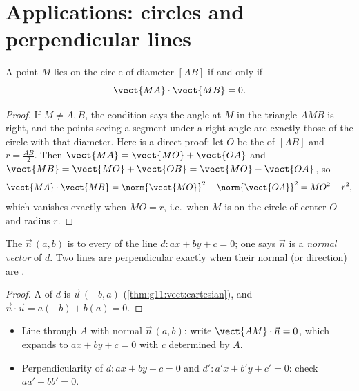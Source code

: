 \section{Applications: circles and perpendicular lines}

\begin{proposition}\label{prop:g11:scal:diameter}
A point $M$ lies on the circle of diameter $[AB]$ if and only if
\[
\vect{MA} \cdot \vect{MB} = 0 .
\]
\end{proposition}

\begin{proof}
If $M \neq A, B$, the condition says the angle at $M$ in the triangle
$AMB$ is right, and the points seeing a segment under a right angle are
exactly those of the circle with that diameter. Here is a direct proof:
let $O$ be the  of $[AB]$ and $r = \frac{AB}{2}$. Then
$\vect{MA} = \vect{MO} + \vect{OA}$ and
$\vect{MB} = \vect{MO} + \vect{OB} = \vect{MO} - \vect{OA}$, so
\[
\vect{MA}\cdot\vect{MB}
= \norm{\vect{MO}}^2 - \norm{\vect{OA}}^2 = MO^2 - r^2,
\]
which vanishes exactly when $MO = r$, i.e.\ when $M$ is on the circle of
center $O$ and radius $r$.
\end{proof}

\begin{proposition}\label{prop:g11:scal:normal}
The  $\vec n\,(a, b)$ is  to every  of the
line $d : ax + by + c = 0$; one says $\vec n$ is a \emph{normal
vector} of $d$. Two lines are perpendicular exactly
when their normal (or direction)  are .
\end{proposition}

\begin{proof}
A  of $d$ is $\vec u\,(-b, a)$
(\cref{thm:g11:vect:cartesian}), and
$\vec n \cdot \vec u = a(-b) + b(a) = 0$.
\end{proof}

\begin{method}\label{met:g11:scal:normal}
\begin{itemize}
  \item Line through $A$ with normal $\vec n\,(a,b)$: write
        $\vect{AM} \cdot \vec n = 0$, which expands to $ax + by + c = 0$
        with $c$ determined by $A$.
  \item Perpendicularity of $d: ax+by+c = 0$ and $d': a'x+b'y+c' = 0$:
        check $aa' + bb' = 0$.
\end{itemize}
\end{method}

